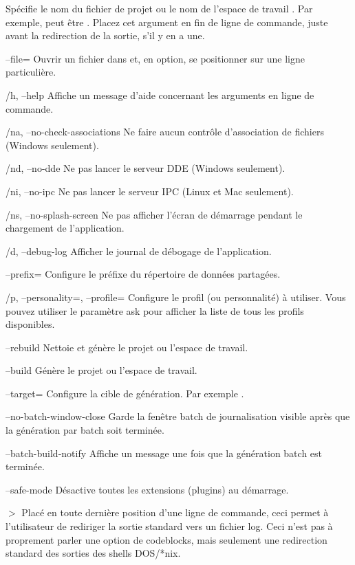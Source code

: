 \begin{optentry}
\item[\var{filename}] Spécifie le nom du fichier de projet  ou le nom de l'espace de travail . Par exemple,  peut être . Placez cet argument en fin de ligne de commande, juste avant la redirection de la sortie, s'il y en a une.
\item[--file=\var{filename}\optional{:ligne}] Ouvrir un fichier dans \codeblocks et, en option, se positionner sur une ligne particulière.
\item[/h, --help] Affiche un message d'aide concernant les arguments en ligne de commande.
\item[/na, --no-check-associations] Ne faire aucun contrôle d'association de fichiers (Windows seulement).
\item[/nd, --no-dde] Ne pas lancer le serveur DDE (Windows seulement).
\item[/ni, --no-ipc] Ne pas lancer le serveur IPC (Linux et Mac seulement).
\item[/ns, --no-splash-screen] Ne pas afficher l'écran de démarrage pendant le chargement de l'application.
\item[/d, --debug-log] Afficher le journal de débogage de l'application.
\item[--prefix=\var{str}] Configure le préfixe du répertoire de données partagées.
\item[/p, --personality=\var{str}, --profile=\var{str}] Configure le profil (ou personnalité) à utiliser. Vous pouvez utiliser le paramètre ask pour afficher la liste de tous les profils disponibles.
\item[--rebuild] Nettoie et génère le projet ou l'espace de travail.
\item[--build] Génère le projet ou l'espace de travail.
\item[--target=\var{str}] Configure la cible de génération. Par exemple .
\item[--no-batch-window-close] Garde la fenêtre batch de journalisation visible après que la génération par batch soit terminée.
\item[--batch-build-notify] Affiche un message une fois que la génération batch est terminée.
\item[--safe-mode] Désactive toutes les extensions (plugins) au démarrage.
\item[$>$ \var{build log file}] Placé en toute dernière position d'une ligne de commande, ceci permet à l'utilisateur de rediriger la sortie standard vers un fichier log. Ceci n'est pas à proprement parler une option de codeblocks, mais seulement une redirection standard des sorties des shells DOS/*nix.
\end{optentry}

